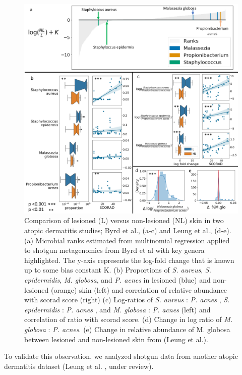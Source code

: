 \begin{figure}
  \includegraphics[width=1\textwidth]{ch4/Figure3.png}
  \caption[Analysis of lesion and non-lesion sites using proportions, log-ratios and ranks on two
    independent atopic dermatis cohorts.]{
    Comparison of lesioned (L) versus non-lesioned (NL) skin in two atopic dermatitis studies;
    Byrd et al.\cite{Byrd2017-eb}, (a-c) and Leung et al.\cite{Leung-DYM}, (d-e). (a) Microbial ranks estimated from
    multinomial regression applied to shotgun metagenomics from Byrd et al\cite{Byrd2017-eb} with key
    genera highlighted. The y-axis represents the log-fold change that is known up to some bias constant K.
    (b) Proportions of \textit{S. aureus}, \textit{S. epidermidis}, \textit{M. globosa}, and \textit{P. acnes}
    in lesioned (blue) and non-lesioned (orange) skin (left) and correlation of relative abundance
    with \gls{scorad} score (right) (c) Log-ratios of \textit{S. aureus} : \textit{P. acnes} , \textit{S. epidermidis} : \textit{P. acnes} ,
    and \textit{M. globosa} : \textit{P. acnes} (left) and correlation of ratio with \gls{scorad} score.
    (d) Change in log ratio of \textit{M. globosa} : \textit{P. acnes}. (e) Change in
    relative abundance of M. globosa between lesioned and non-lesioned skin from (Leung et al.\cite{Leung-DYM}).}
\end{figure}
%
To validate this observation, we analyzed shotgun data from another atopic dermatitis dataset (Leung et al. \cite{Leung-DYM}, under review).
